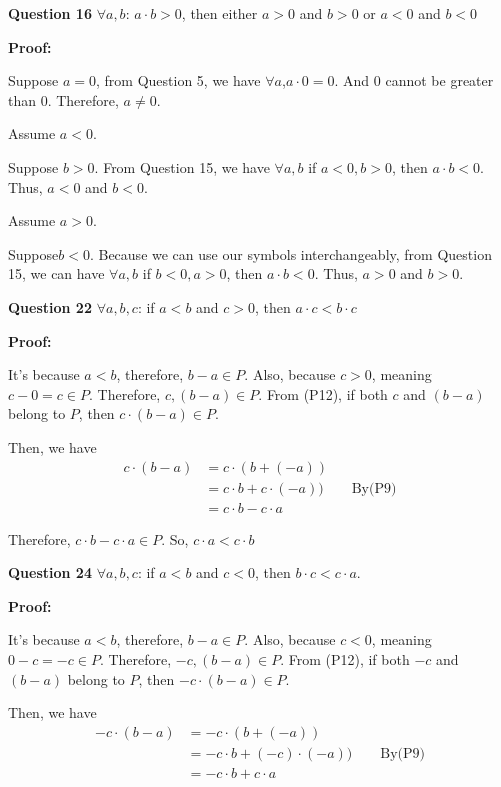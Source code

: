 \documentclass[a4paper,12pt]{report}
\begin{document}
\noindent
\textbf{Question 16} $\forall a,b$: $a\cdot{b}>0$, then either $a>0$ and $b>0$ or $a<0$ and $b<0$

\noindent
\textbf{Proof:}

\noindent
Suppose $a=0$, from Question 5, we have $\forall a$,$a\cdot{0}=0$. And 0 cannot be greater than 0. Therefore, $a\neq 0$.

\noindent
Assume $a < 0$.

\noindent
Suppose $b>0$. From Question 15, we have $\forall a,b$ if $a<0, b>0$, then $ a\cdot{b}<0$. Thus, $a<0$ and $b<0$.

\noindent
Assume $a>0$. 

\noindent
Suppose$b<0$. Because we can use our symbols interchangeably, from Question 15, we can have $\forall a,b$ if $b<0, a>0$, then $ a\cdot{b}<0$. Thus, $a>0$ and $b>0$.


\noindent
\textbf{Question 22} $\forall a,b,c$: if $a<b$ and $c>0$, then $a\cdot{c}<b\cdot{c}$

\noindent
\textbf{Proof:}

\noindent
It's because $a<b$, therefore, $b-a\in P$. Also, because $c>0$, meaning $c-0 = c\in P$. Therefore, $c,(b-a)\in P$. From (P12), if both $c$ and $(b-a)$ belong to $P$, then $c\cdot{(b-a)}\in P$.

\noindent
Then, we have  
\begin{align*}
 c\cdot{(b-a)} & = c\cdot{(b+(-a))}\\
 & = c\cdot{b}+c\cdot{(-a))}\qquad \text{By(P9)}\\
 & = c\cdot{b} - c\cdot{a}
\end{align*}

\noindent
Therefore, $c\cdot{b}-c\cdot{a}\in P$. So, $c\cdot{a}<c\cdot{b}$

\noindent
\textbf{Question 24} $\forall a,b,c$: if $a<b$ and $c<0$, then $b\cdot{c}<c\cdot{a}$.

\noindent
\textbf{Proof:}

\noindent
It's because $a<b$, therefore, $b-a\in P$. Also, because $c<0$, meaning $0-c=-c\in P$.  Therefore, $-c,(b-a)\in P$. From (P12), if both $-c$ and $(b-a)$ belong to $P$, then $-c\cdot{(b-a)}\in P$.

\noindent
Then, we have  
\begin{align*}
 -c\cdot{(b-a)} & = -c\cdot{(b+(-a))}\\
 & = -c\cdot{b}+(-c)\cdot{(-a))}\qquad \text{By(P9)}\\
 & = -c\cdot{b} + c\cdot{a}
\end{align*}
\end{document}

